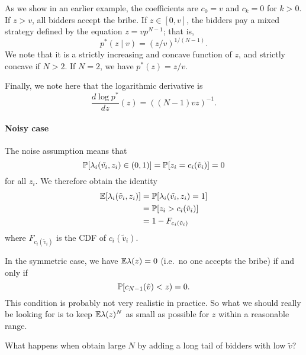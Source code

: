 \begin{example}

  As we show in an earlier example, the coefficients are $c_0 = v$ and $c_k=0$ for $k>0$.
  If $z>v$, all bidders accept the bribe.
  If $z\in[0,v]$, the bidders pay a mixed strategy defined by the equation $z=vp^{N-1}$; that is,
  \[
    p^*(z\mid v) = (z/v)^{1/(N-1)}.
  \] 
  We note that it is a strictly increasing and concave function of $z$, and strictly concave if $N>2$.
  If $N=2$, we have $p^*(z)=z/v$.
  
  Finally, we note here that the logarithmic derivative is 
  \[
    \frac{d\log p^*}{dz}(z)= ((N-1)vz)^{-1}.
  \]

\end{example}


\paragraph{Noisy case}
The noise assumption means that 
\[
  \mathbb{P}[\lambda_i(\tilde{v_i},z_i)\in(0,1)]=\mathbb{P}[z_i=c_i(\tilde{v}_i)] = 0
\]
for all $z_i$. 
%
We therefore obtain the identity
\begin{align*}
  \mathbb{E}[\lambda_i(\tilde{v}_i,z_i)] &= \mathbb{P}[\lambda_i(\tilde{v_i},z_i) = 1] \\
  &= \mathbb{P}[z_i > c_i(\tilde{v}_i)] \\
  &= 1 - F_{c_i(\tilde{v}_i)}
\end{align*}
where $F_{c_i(\tilde{v}_i)}$ is the CDF of $c_i(\tilde{v}_i)$.

In the symmetric case, we have $\mathbb{E}\lambda(z)=0$ (i.e.~no one accepts the bribe) if and only if
\[
  \mathbb{P}[c_{N-1}(\tilde v)<z) = 0.
\]
This condition is probably not very realistic in practice.
%
So what we should really be looking for is to keep $\mathbb{E}\lambda(z)^N$ as small as possible for $z$ within a reasonable range.

\begin{question}What happens when obtain large $N$ by adding a long tail of bidders with low $\tilde{v}$?\end{question}

